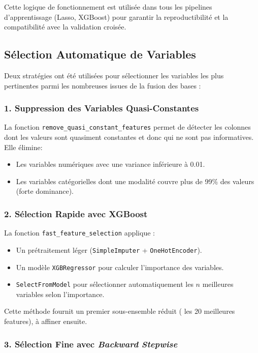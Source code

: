 Cette logique de fonctionnement est utilisée dans tous les pipelines d’apprentissage (Lasso, XGBoost) pour garantir la reproductibilité et la compatibilité avec la validation croisée.

\subsection{Sélection Automatique de Variables}

Deux stratégies ont été utilisées pour sélectionner les variables les plus pertinentes parmi les nombreuses issues de la fusion des bases :

\subsubsection*{1. Suppression des Variables Quasi-Constantes}

La  fonction \texttt{remove\_quasi\_constant\_features} permet de détecter les colonnes dont les valeurs sont quasiment constantes et donc qui ne sont pas informatives. Elle élimine:

\begin{itemize}
  \item Les variables numériques avec une variance inférieure à 0.01.
  \item Les variables catégorielles dont une modalité couvre plus de 99\% des valeurs (forte dominance).
\end{itemize}

\subsubsection*{2. Sélection Rapide avec XGBoost}

La fonction \texttt{fast\_feature\_selection} applique :

\begin{itemize}
  \item Un prétraitement léger (\texttt{SimpleImputer} + \texttt{OneHotEncoder}).
  \item Un modèle \texttt{XGBRegressor} pour calculer l’importance des variables.
  \item \texttt{SelectFromModel} pour sélectionner automatiquement les $n$ meilleures variables selon l’importance.
\end{itemize}

Cette méthode fournit un premier sous-ensemble réduit ( les 20 meilleures features), à affiner ensuite.

\subsubsection*{3. Sélection Fine avec \textit{Backward Stepwise}}


